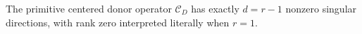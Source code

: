 The primitive centered donor operator \(\mathcal C_D\) has exactly \(d=r-1\) nonzero singular directions, with rank zero interpreted literally when \(r=1\).